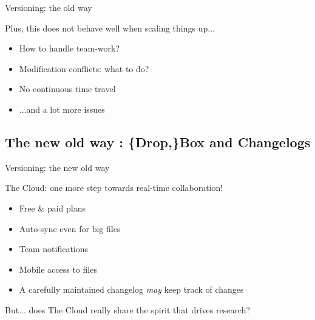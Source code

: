 \documentclass[10pt]{beamer}
\begin{document}
\begin{frame}{Versioning: the old way} %

	Plus, this does not behave well when scaling things up...

	\begin{itemize}
		\item How to handle team-work?
		\item Modification conflicts: what to do?
		\item No continuous time travel
		\item ...and a lot more issues
	\end{itemize}

\end{frame}


\subsection{The new old way : \{Drop,\}Box and Changelogs} %

\begin{frame}{Versioning: the new old way} %

	The Cloud: one more step towards real-time collaboration!

	\begin{itemize}
		\item Free \& paid plans
		\item Auto-sync even for big files
		\item Team notifications
		\item Mobile access to files
		\item A carefully maintained changelog \emph{may} keep track of changes
	\end{itemize}

	\pause
	But...
	\pause
	does The Cloud really share the spirit that drives research?

\end{frame}
\end{document}
